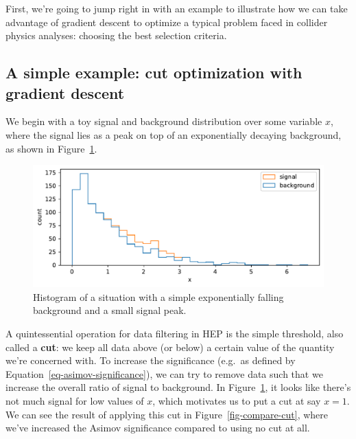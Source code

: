 \documentclass[
  11pt,
  numbers=noendperiod]{book}
\begin{document}
First, we're going to jump right in with an example to illustrate how we
can take advantage of gradient descent to optimize a typical problem
faced in collider physics analyses: choosing the best selection
criteria.

\hypertarget{a-simple-example-cut-optimization-with-gradient-descent}{%
\subsection{A simple example: cut optimization with gradient
descent}\label{a-simple-example-cut-optimization-with-gradient-descent}}

We begin with a toy signal and background distribution over some
variable \(x\), where the signal lies as a peak on top of an
exponentially decaying background, as shown in Figure~\ref{fig-exp-bkg}.

\begin{figure}

{\centering \includegraphics{./diffprog-hep_files/figure-pdf/fig-exp-bkg-output-1.pdf}

}

\caption{\label{fig-exp-bkg}Histogram of a situation with a simple
exponentially falling background and a small signal peak.}

\end{figure}

A quintessential operation for data filtering in HEP is the simple
threshold, also called a \textbf{cut}: we keep all data above (or below)
a certain value of the quantity we're concerned with. To increase the
significance (e.g.~as defined by Equation~\ref{eq-asimov-significance}),
we can try to remove data such that we increase the overall ratio of
signal to background. In Figure~\ref{fig-exp-bkg}, it looks like there's
not much signal for low values of \(x\), which motivates us to put a cut
at say \(x=1\). We can see the result of applying this cut in
Figure~\ref{fig-compare-cut}, where we've increased the Asimov
significance compared to using no cut at all.
\end{document}
